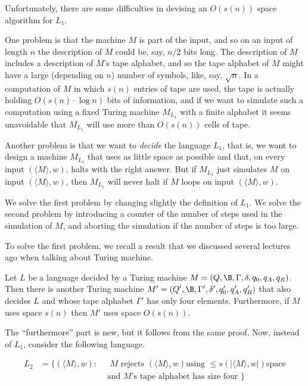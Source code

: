 \documentclass[11pt]{article}
\begin{document}
Unfortunately, there are some difficulties in devising an $O(s(n))$ space
algorithm for $L_1$. 

One  problem is that the machine $M$ is part of the input,
and so on an input of length $n$ the description of $M$ could be, say, $n/2$ bits
long. The description of $M$ includes a description of $M$'s tape alphabet, and
so the tape alphabet of $M$ might have a large (depending on $n$) number of
symbols, like, say, $\sqrt n$. In a computation of $M$ in which $s(n)$ entries
of tape are used, the tape is actually holding $O(s(n) \cdot \log n)$ bits of
information, and if we want to simulate such a computation using a fixed
Turing machine $M_{L_1}$ with a finite alphabet it seems unavoidable that $M_{L_1}$
will use more than $O(s(n))$ cells of tape.

Another problem is that we want to {\em decide} the language $L_1$, that is, 
we want to design a machine $M_{L_1}$ that uses as little space as possible
and that, on every input $(\langle M \rangle , w)$, halts with the right answer.
But if $M_{L_1}$ just simulates $M$ on input $(\langle M \rangle , w)$, then $M_{L_1}$
will never halt if $M$ loops on input $(\langle M \rangle , w)$.

We solve the first problem by changing slightly the definition of $L_1$. We
solve the second problem by introducing a counter of the number of steps
used in the simulation of $M$, and aborting the simulation if the number
of steps is too large.

To solve the first problem, we recall a result that we discussed several lectures 
ago when talking about Turing machine.

\begin{lemma} \label{lm:alpha}
Let $L$ be a language decided by a Turing machine $M = (Q,\B, \Gamma,\delta,q_0,q_A,q_R)$. Then there is
another Turing machine $M'=(Q',\B, \Gamma',\delta',q'_0,q'_A,q'_R)$
that also decides $L$ and whose tape alphabet $\Gamma'$ has only four elements.
Furthermore, if $M$ uses space $s(n)$ then $M'$ uses space $O(s(n))$.
\end{lemma}

The ``furthermore'' part is new, but it follows from the same proof.
Now, instead of $L_1$, consider the following language.

\begin{eqnarray*}
 L_2 &=  \{ ( \langle M \rangle, w) : & \mbox{ $M$ rejects $( \langle M \rangle, w) $
using $\leq s(|\langle M \rangle, w|)$
space} \\ && \mbox{ and  $M$'s tape alphabet has size four } \} \end{eqnarray*}
\end{document}
